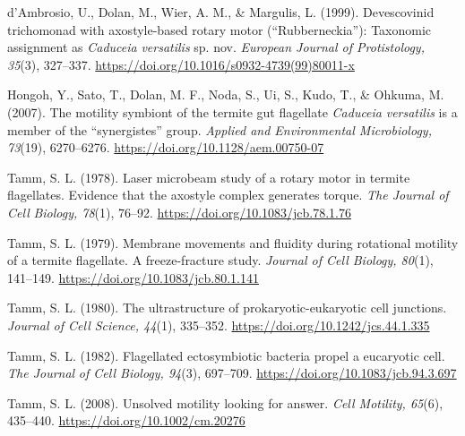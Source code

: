 \documentclass[authordate, anecdote]{jote-new-article}
\begin{document}
	



	d'Ambrosio, U., Dolan, M., Wier, A. M., \& Margulis, L. (1999). Devescovinid trichomonad with axostyle-based rotary motor (“Rubberneckia”): Taxonomic assignment as \emph{Caduceia}\emph{ }\emph{versatilis} sp. nov. \emph{European Journal of Protistology, 35}(3), 327--337. \url{https://doi.org/10.1016/s0932-4739(99)80011-x}



	



	Hongoh, Y., Sato, T., Dolan, M. F., Noda, S., Ui, S., Kudo, T., \& Ohkuma, M. (2007). The motility symbiont of the termite gut flagellate \emph{Caduceia}\emph{ }\emph{versatilis} is a member of the “synergistes” group. \emph{Applied and Environmental Microbiology, 73}(19), 6270--6276. \url{https://doi.org/10.1128/aem.00750-07}



	



	Tamm, S. L. (1978). Laser microbeam study of a rotary motor in termite flagellates.	Evidence that the axostyle complex generates torque. \emph{The Journal of Cell}	\emph{Biology, 78}(1), 76--92. \url{https://doi.org/10.1083/jcb.78.1.76}



	



	Tamm, S. L. (1979). Membrane movements and fluidity during rotational motility of a termite flagellate. A freeze-fracture study. \emph{Journal of Cell Biology, 80}(1), 141--149. \url{https://doi.org/10.1083/jcb.80.1.141}



	



	Tamm, S. L. (1980). The ultrastructure of prokaryotic-eukaryotic cell junctions. \emph{Journal of Cell Science, 44}(1), 335--352. \url{https://doi.org/10.1242/jcs.44.1.335}


	



	Tamm, S. L. (1982). Flagellated ectosymbiotic bacteria propel a eucaryotic cell. \emph{The Journal} \emph{of Cell Biology, 94}(3), 697--709. \url{https://doi.org/10.1083/jcb.94.3.697}



	



	Tamm, S. L. (2008). Unsolved motility looking for answer. \emph{Cell Motility, 65}(6), 435--440. \url{https://doi.org/10.1002/cm.20276}
\end{document}
